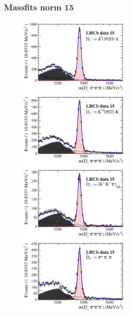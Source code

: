 \documentclass[]{beamer}
\begin{document}
\begin{frame}
\frametitle{Massfits norm 15}

\begin{figure}[h]
\includegraphics[height=!,width=0.5\textwidth]{plots/norm_y15_phipi.pdf}
\includegraphics[height=!,width=0.5\textwidth]{plots/norm_y15_KsK.pdf}\\
\includegraphics[height=!,width=0.5\textwidth]{plots/norm_y15_KKpi_NR.pdf}
\includegraphics[height=!,width=0.5\textwidth]{plots/norm_y15_pipipi.pdf}
\end{figure}

\end{frame}
\end{document}
